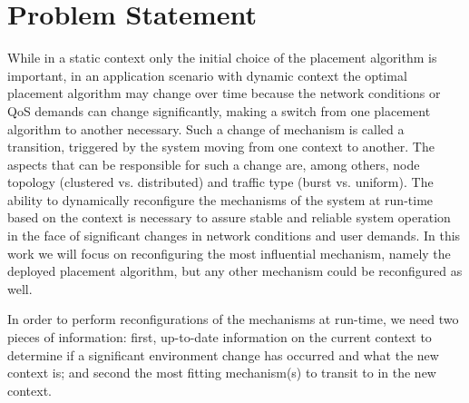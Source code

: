 \section{Problem Statement}
While in a static context only the initial choice of the placement algorithm is important, in an application scenario with dynamic context the optimal placement algorithm may change over time because the network conditions or QoS demands can change significantly, making a switch from one placement algorithm to another necessary. Such a change of mechanism is called a transition, triggered by the system moving from one context to another. The aspects that can be responsible for such a change are, among others, node topology (clustered vs. distributed) and traffic type (burst vs. uniform). 
The ability to dynamically reconfigure the mechanisms of the system at run-time based on the context is necessary to assure stable and reliable system operation in the face of significant changes in network conditions and user demands. 
In this work we will focus on reconfiguring the most influential mechanism, namely the deployed placement algorithm, but any other mechanism could be reconfigured as well. 

In order to perform reconfigurations of the mechanisms at run-time, we need two pieces of information: first, up-to-date information on the current context to determine if a significant environment change has occurred and what the new context is; and second the most fitting mechanism(s) to transit to in the new context.
 

